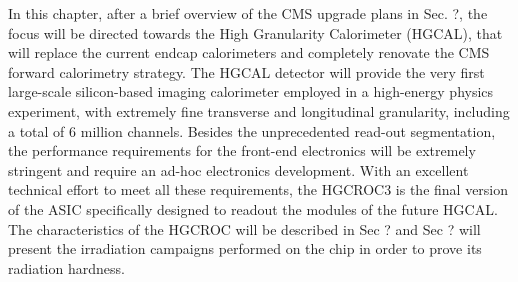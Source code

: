 In this chapter, after a brief overview of the CMS upgrade plans in Sec. {?}, the focus will be directed towards the High Granularity Calorimeter (HGCAL), that will replace the current endcap calorimeters and completely renovate the CMS forward calorimetry strategy. The HGCAL detector will provide the very first large-scale silicon-based imaging calorimeter employed in a high-energy physics experiment, with extremely fine transverse and longitudinal granularity, including a total of 6 million channels. Besides the unprecedented read-out segmentation, the performance requirements for the front-end electronics will be extremely stringent and require an ad-hoc electronics development. With an excellent technical effort to meet all these requirements, the HGCROC3 is the final version of the ASIC specifically designed to readout the modules of the future HGCAL. 
The characteristics of the HGCROC will be described in Sec {?} and Sec {?} will present the irradiation campaigns performed on the chip in order to prove its radiation hardness.

\section{}